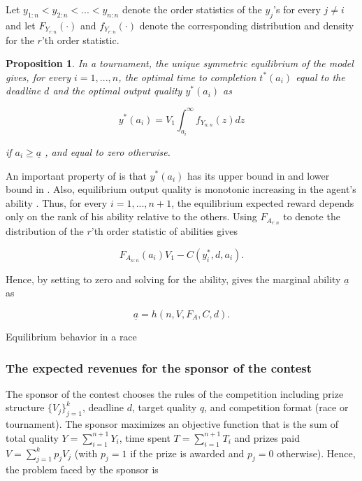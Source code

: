 \documentclass[12pt,]{article}
\newtheorem{proposition}{Proposition}
\begin{document}
Let \(y_{1:n} < y_{2:n} < ... < y_{n:n}\) denote the order statistics of
the \(y_j\)'s for every \(j\neq i\) and let \({F_{Y_{r:n}}}(\cdot)\) and
\({f_{Y_{r:n}}}(\cdot)\) denote the corresponding distribution and
density for the \(r\)'th order statistic.

\begin{proposition}

In a tournament, the unique symmetric equilibrium of the model gives,
for every \(i=1, ..., n\), the optimal time to completion \(t^*(a_i)\)
equal to the deadline \(d\) and the optimal output quality \(y^*(a_i)\)
as

\[\label{eq: optimal bid tournament}
  y^*(a_i) =  V_1 \int_{a_i}^\infty {f_{Y_{n:n}}} (z) dz\]

if \({a_i}\geq {\underline a}\) \citep[see][]{moldovanu2001optimal}, and
equal to zero otherwise.

\end{proposition}

An important property of is that \(y^*(a_i)\) has its upper bound in and
lower bound in . Also, equilibrium output quality is monotonic
increasing in the agent's ability \citep[see][]{moldovanu2001optimal}.
Thus, for every \(i=1, ..., n+1\), the equilibrium expected reward
depends only on the rank of his ability relative to the others. Using
\({F_{A_{r:n}}}\) to denote the distribution of the \(r\)'th order
statistic of abilities gives

\[\label{eq: expected payoffs tournament}
  {F_{A_{n:n}}}(a_i) V_1  - C(y_i^*, d, a_i).\]

Hence, by setting to zero and solving for the ability, gives the
marginal ability \({\underline a}\) as

\[{\underline a}= h(n, V, F_A, C, d).\]

\begin{corollary}

Equilibrium behavior in a race

\end{corollary}

\subsubsection{The expected revenues for the sponsor of the
contest}\label{the-expected-revenues-for-the-sponsor-of-the-contest}

The sponsor of the contest chooses the rules of the competition
including prize structure \(\{V_j\}_{j=1}^k\), deadline \(d\), target
quality \(q\), and competition format (race or tournament). The sponsor
maximizes an objective function that is the sum of total quality
\(Y=\sum_{i=1}^{n+1} Y_i\), time spent \(T=\sum_{i=1}^{n+1} T_i\) and
prizes paid \(V=\sum_{j=1}^k p_{j} V_j\) (with \(p_j=1\) if the prize is
awarded and \(p_j=0\) otherwise). Hence, the problem faced by the
sponsor is
\end{document}
